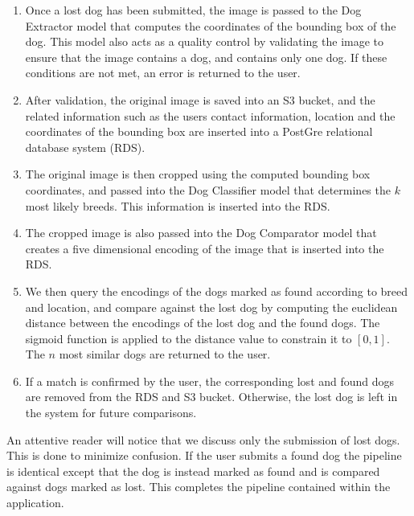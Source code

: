 \documentclass{article}
\begin{document}
\begin{enumerate}
  
  \item Once a lost dog has been submitted, the image is passed to the Dog Extractor model that computes the coordinates of the bounding box of the dog.  This model also acts as a quality control by validating the image to ensure that the image contains a dog, and contains only one dog.  If these conditions are not met, an error is returned to the user.
  
  \item After validation, the original image is saved into an S3 bucket, and the related information such as the users contact information, location and the coordinates of the bounding box are inserted into a PostGre relational database system (RDS).
  
  \item The original image is then cropped using the computed bounding box coordinates, and passed into the Dog Classifier model that determines the $k$ most likely breeds.  This information is inserted into the RDS.
  
  \item The cropped image is also passed into the Dog Comparator model that creates a five dimensional encoding of the image that is inserted into the RDS.
  
  \item We then query the encodings of the dogs marked as found according to breed and location, and compare against the lost dog by computing the euclidean distance between the encodings of the lost dog and the found dogs.  The sigmoid function is applied to the distance value to constrain it to $[0,1]$.  The $n$ most similar dogs are returned to the user.
  
  \item If a match is confirmed by the user, the corresponding lost and found dogs are removed from the RDS and S3 bucket.  Otherwise, the lost dog is left in the system for future comparisons.
  
\end{enumerate}



An attentive reader will notice that we discuss only the submission of lost dogs.  This is done to minimize confusion.  If the user submits a found dog the pipeline is identical except that the dog is instead marked as found and is compared against dogs marked as lost.  This completes the pipeline contained within the application. 
\end{document}
